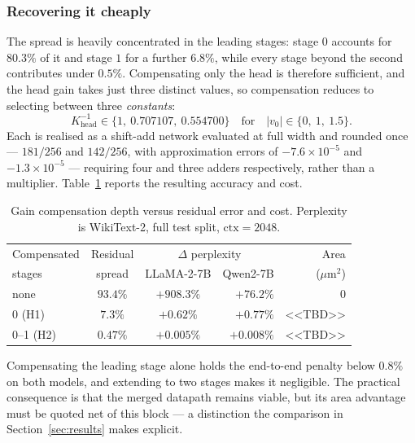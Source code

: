 \subsubsection{Recovering it cheaply}
The spread is heavily concentrated in the leading stages: stage $0$ accounts
for $80.3\%$ of it and stage $1$ for a further $6.8\%$, while every stage
beyond the second contributes under $0.5\%$. Compensating only the head is
therefore sufficient, and the head gain takes just three distinct values, so
compensation reduces to selecting between three \emph{constants}:
\begin{equation}
  K_{\text{head}}^{-1} \in \{1,\ 0.707107,\ 0.554700\}
  \quad\text{for}\quad |v_0| \in \{0,\ 1,\ 1.5\}.
\end{equation}
Each is realised as a shift-add network evaluated at full width and rounded
once --- $181/256$ and $142/256$, with approximation errors of
$-7.6\times10^{-5}$ and $-1.3\times10^{-5}$ --- requiring four and three adders
respectively, rather than a multiplier. Table~\ref{tab:gaincomp} reports the
resulting accuracy and cost.

\begin{table}[t]
\caption{Gain compensation depth versus residual error and cost.
Perplexity is WikiText-2, full test split, $\mathrm{ctx} = 2048$.}
\label{tab:gaincomp}
\centering
\begin{tabular}{lccrr}
\toprule
Compensated & Residual & \multicolumn{2}{c}{$\Delta$ perplexity} & Area \\
stages & spread & LLaMA-2-7B & Qwen2-7B & ($\mu$m$^2$) \\
\midrule
none      & $93.4\%$ & $+908.3\%$ & $+76.2\%$ & $0$ \\
0 (H1)    & $7.3\%$  & $+0.62\%$  & $+0.77\%$ & <<TBD>> \\
0--1 (H2) & $0.47\%$ & $+0.005\%$ & $+0.008\%$ & <<TBD>> \\
\bottomrule
\end{tabular}
\end{table}

Compensating the leading stage alone holds the end-to-end penalty below
$0.8\%$ on both models, and extending to two stages makes it negligible. The
practical consequence is that the merged datapath remains viable, but its area
advantage must be quoted net of this block --- a distinction the comparison in
Section~\ref{sec:results} makes explicit.
